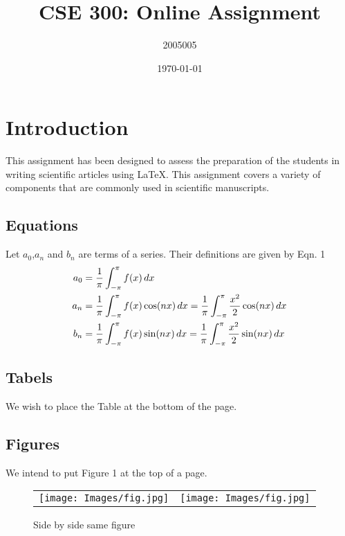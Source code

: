 \documentclass[20pt]{article}
\title{CSE 300: Online Assignment}
\author{2005005}
\date{\today}
\begin{document}
\maketitle

\section{Introduction}
This assignment has been designed to assess the preparation of the students
in writing scientific articles using \LaTeX. This assignment covers a variety of
components that are commonly used in scientific manuscripts.
\subsection{Equations} 
 Let $a_0$,$a_n$ and $b_n$ are terms of a series. Their definitions are given by Eqn. 1\\
 \begin{align}
a_0 &= \frac{1}{\pi} \int_{-\pi}^{\pi} f(x) \,dx \notag \\
a_n &= \frac{1}{\pi} \int_{-\pi}^{\pi} f(x) \cos(nx) \,dx = \frac{1}{\pi} \int_{-\pi}^{\pi} \frac{x^2}{2} \cos(nx) \,dx \notag \\
b_n &= \frac{1}{\pi} \int_{-\pi}^{\pi} f(x) \sin(nx) \,dx = \frac{1}{\pi} \int_{-\pi}^{\pi} \frac{x^2}{2} \sin(nx) \,dx
\end{align}
\subsection{Tabels}
We wish to place the Table at the bottom of the page.
\subsection{Figures}
We intend to put Figure 1 at the top of a page.
\pagebreak
\begin{figure}[h]
    \centering
    \begin{tabular}{c c}
        \texttt{[image: Images/fig.jpg]} & \texttt{[image: Images/fig.jpg]}  \\
    \end{tabular}
    \caption{Side by side same figure}
    \label{fig:enter-label}
\end{figure}
\end{document}
